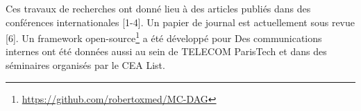 \documentclass{article}
\begin{document}
\vspace{.5cm}
Ces travaux de recherches ont donné lieu à des articles publiés dans des conférences internationales [1-4]. 
Un papier de journal est actuellement sous revue [6]. Un framework 
open-source\footnote{\url{https://github.com/robertoxmed/MC-DAG}} a été développé pour Des 
communications internes ont été données aussi au 
sein de TELECOM ParisTech et dans des séminaires organisés par le CEA List.
\end{document}
